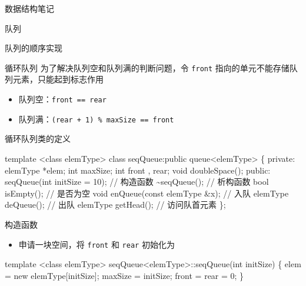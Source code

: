 \documentclass[
  ignorenonframetext,
]{beamer}
\newenvironment{Shaded}{}{}
\newcommand{\NormalTok}[1]{#1}
\providecommand{\tightlist}{%
  \setlength{\itemsep}{0pt}\setlength{\parskip}{0pt}}
\begin{document}
\begin{frame}[fragile]{数据结构笔记}
\begin{block}{队列}
\begin{block}{队列的顺序实现}
\begin{block}{循环队列}
为了解决队列空和队列满的判断问题，令 \texttt{front}
指向的单元不能存储队列元素，只能起到标志作用

\begin{itemize}
\tightlist
\item
  队列空：\texttt{front\ ==\ rear}
\item
  队列满：\texttt{(rear\ +\ 1)\ \%\ maxSize\ ==\ front}
\end{itemize}

\begin{block}{循环队列类的定义}
\protect{}\label{ux5faaux73afux961fux5217ux7c7bux7684ux5b9aux4e49}
\begin{Shaded}
\begin{Highlighting}[]
\NormalTok{template \textless{}class elemType\textgreater{}}
\NormalTok{class seqQueue:public queue\textless{}elemType\textgreater{}}
\NormalTok{\{}
\NormalTok{  private:}
\NormalTok{    elemType *elem;}
\NormalTok{    int maxSize;}
\NormalTok{    int front , rear;}
\NormalTok{    void doubleSpace();}
\NormalTok{  public:}
\NormalTok{    seqQueue(int initSize = 10);        // 构造函数}
\NormalTok{    \textasciitilde{}seqQueue();                        // 析构函数}
\NormalTok{    bool isEmpty();                     // 是否为空}
\NormalTok{    void enQueue(const elemType \&x);    // 入队}
\NormalTok{    elemType deQueue();                 // 出队}
\NormalTok{    elemType getHead();                 // 访问队首元素}
\NormalTok{\};}
\end{Highlighting}
\end{Shaded}
\end{block}

\begin{block}{构造函数}
\protect{}\label{ux6784ux9020ux51fdux6570-5}
\begin{itemize}
\tightlist
\item
  申请一块空间，将 \texttt{front} 和 \texttt{rear} 初始化为 {}
\end{itemize}

\begin{Shaded}
\begin{Highlighting}[]
\NormalTok{template \textless{}class elemType\textgreater{}}
\NormalTok{seqQueue\textless{}elemType\textgreater{}::seqQueue(int initSize)}
\NormalTok{\{}
\NormalTok{  elem = new elemType[initSize];}
\NormalTok{  maxSize = initSize;}
\NormalTok{  front = rear = 0;}
\NormalTok{\}}
\end{Highlighting}
\end{Shaded}
\end{block}


\end{block}
\end{block}
\end{block}
\end{frame}
\end{document}
